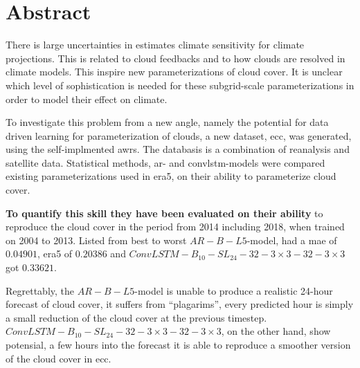\chapter*{Abstract}

There is large uncertainties in estimates climate sensitivity for climate projections. This is related to cloud feedbacks and to how clouds are resolved in climate models. 
This inspire new parameterizations of cloud cover. It is unclear which level of sophistication is needed for these subgrid-scale parameterizations in order to model their effect on climate.

To investigate this problem from a new angle, namely the potential for data driven learning for parameterization of clouds, a new dataset, \acrfull{ecc}, was generated, using the self-implmented \acrfull{awrs}. The databasis is a combination of reanalysis and satellite data. %
Statistical methods, \acrfull{ar}- and \acrfull{convlstm}-models were compared existing parameterizations used in \acrshort{era5}, on their ability to parameterize cloud cover. 

\textbf{To quantify this skill they have been evaluated on their ability} to reproduce the cloud cover in the period from 2014 including 2018, when trained on 2004 to 2013. Listed from best to worst 
$AR-B-L5$-model, had a \acrshort{mae} of $0.04901$, \acrshort{era5} of $0.20386$ and $ConvLSTM-B_{10}-SL_{24}-32-3\times3-32-3 \times3$ got $0.33621$.

Regrettably, the $AR-B-L5$-model is unable to produce a realistic 24-hour forecast of cloud cover, it suffers from ``plagarims'', every predicted hour is simply a small reduction of the cloud cover at the previous timestep.
$ConvLSTM-B_{10}-SL_{24}-32-3\times3-32-3 \times3$, on the other hand, show potensial, a few hours into the forecast it is able to reproduce a smoother version of the cloud cover in \acrshort{ecc}.


